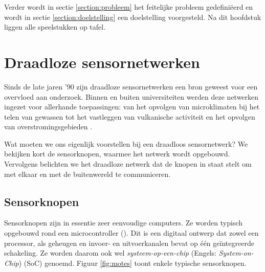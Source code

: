 Verder wordt in sectie \ref{section:probleem} het feitelijke probleem
gedefini\"eerd en wordt in sectie \ref{section:doelstelling} een doelstelling
voorgesteld. Na dit hoofdstuk liggen alle speelstukken op tafel.

\section{Draadloze sensornetwerken}
\label{section:wsn}

Sinds de late jaren '90 zijn draadloze sensornetwerken een bron geweest voor
een overvloed aan onderzoek. Binnen en buiten universiteiten werden deze
netwerken ingezet voor allerhande toepassingen: van het opvolgen van
microklimaten bij het telen van gewassen \citep{baggio2005wireless} tot het
vastleggen van vulkanische activiteit \citep{werner2005monitoring} en het
opvolgen van overstromingsgebieden \citep{hughes2006gridstix}.

Wat moeten we ons eigenlijk voorstellen bij een draadloos sensornetwerk? We
bekijken kort de sensorknopen, waarmee het netwerk wordt opgebouwd. Vervolgens
belichten we het draadloze netwerk dat de knopen in staat stelt om met elkaar
en met de buitenwereld te communiceren.

\subsection{Sensorknopen}

Sensorknopen zijn in essentie zeer eenvoudige computers. Ze worden typisch
opgebouwd rond een microcontroller (\mcu). Dit is een digitaal ontwerp dat
zowel een processor, als geheugen en invoer- en uitvoerkanalen bevat op \'e\'en
ge\"integreerde schakeling. Ze worden daarom ook wel \emph{systeem-op-een-chip}
(Engels: \emph{System-on-Chip}) (SoC) genoemd. Figuur \ref{fig:motes} toont
enkele typische sensorknopen.

